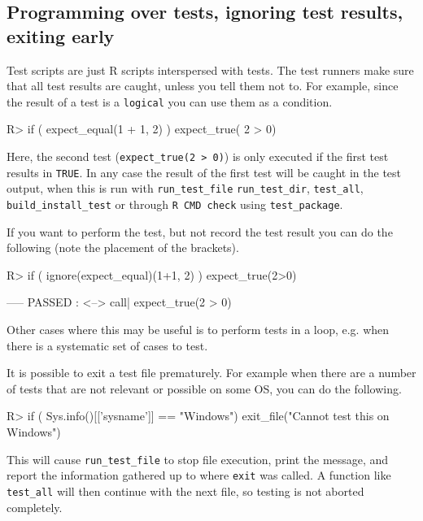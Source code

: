 \documentclass[11pt]{article}
\newcommand{\code}[1]{\texttt{#1}}
\let\oldmarginpar\marginpar
\renewcommand{\marginpar}[1]{\oldmarginpar{\color{bluetext}\raggedleft\scriptsize #1}}
\begin{document}
\subsection{Programming over tests, ignoring test results, exiting early}
Test scripts are just R scripts interspersed with tests. The test runners make
sure that all test results are caught, unless you tell them not to. For
example, since the result of a test is a \code{logical} you can use them as a
condition.
\begin{Schunk}
\begin{Sinput}
R>  if ( expect_equal(1 + 1, 2) ){
        expect_true( 2 > 0)
    }
\end{Sinput}
\end{Schunk}
Here, the second test (\code{expect\_true(2 > 0)}) is only executed if the
first test results in \code{TRUE}. In any case the result of the first test
will be caught in the test output, when this is run with \code{run\_test\_file}
\code{run\_test\_dir}, \code{test\_all}, \code{build\_install\_test} or through
\code{R CMD check} using \code{test\_package}.

If you want to perform the test, but not record the test result you can do the
following \marginpar{\code{ignore}} (note the placement of the brackets).
\begin{Schunk}
\begin{Sinput}
R>  if ( ignore(expect_equal)(1+1, 2) ){
      expect_true(2>0)
    }
\end{Sinput}
\begin{Soutput}
----- PASSED      : <-->
 call| expect_true(2 > 0) 
\end{Soutput}
\end{Schunk}
Other cases where this may be useful is to perform tests in a loop, e.g. when
there is a systematic set of cases to test.

It is possible to exit a test file prematurely. For example when there
are a number of tests that are not relevant or possible on some OS,
you can do the following. \marginpar{\code{exit\_file}}
\begin{Schunk}
\begin{Sinput}
R>  if ( Sys.info()[['sysname']] == "Windows"){
      exit_file("Cannot test this on Windows")
    }
\end{Sinput}
\end{Schunk}
This will cause \code{run\_test\_file} to stop file execution, print the
message,  and report the information gathered up to where \code{exit} was
called. A function like \code{test\_all} will then continue with the next file,
so testing is not aborted completely.
\end{document}
